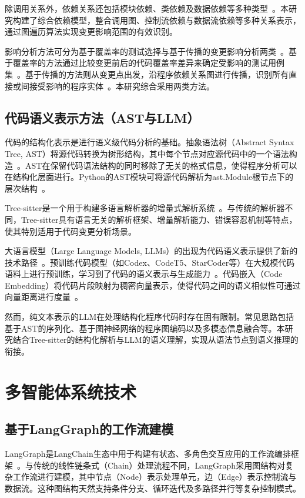 除调用关系外，依赖关系还包括模块依赖、类依赖及数据依赖等多种类型~\cite{AnselmGoldberg2003}。本研究构建了综合依赖模型，整合调用图、控制流依赖与数据流依赖等多种关系表示，通过图遍历算法实现变更影响范围的有效识别。

影响分析方法可分为基于覆盖率的测试选择与基于传播的变更影响分析两类~\cite{BohnerArnold1996}。基于覆盖率的方法通过比较变更前后的代码覆盖率差异来确定受影响的测试用例集~\cite{Chilakapati1998}。基于传播的方法则从变更点出发，沿程序依赖关系图进行传播，识别所有直接或间接受影响的程序实体~\cite{Le2018ImpactPropagation}。本研究综合采用两类方法。

\subsection{代码语义表示方法（AST与LLM）}
代码的结构化表示是进行语义级代码分析的基础。抽象语法树（Abstract Syntax Tree, AST）将源代码转换为树形结构，其中每个节点对应源代码中的一个语法构造~\cite{Aho2006Compilers}。AST在保留代码语法结构的同时移除了无关的格式信息，使得程序分析可以在结构化层面进行。Python的AST模块可将源代码解析为\textsf{ast.Module}根节点下的层次结构~\cite{PythonAST}。

Tree-sitter是一个用于构建多语言解析器的增量式解析系统~\cite{Brunsfeld2018TreeSitter}。与传统的解析器不同，Tree-sitter具有语言无关的解析框架、增量解析能力、错误容忍机制等特点，使其特别适用于代码变更分析场景。

大语言模型（Large Language Models, LLMs）的出现为代码语义表示提供了新的技术路径~\cite{Fan2023LLMSurvey}。预训练代码模型（如Codex、CodeT5、StarCoder等）在大规模代码语料上进行预训练，学习到了代码的语义表示与生成能力~\cite{Chen2021Codex}。代码嵌入（Code Embedding）将代码片段映射为稠密向量表示，使得代码之间的语义相似性可通过向量距离进行度量~\cite{Hindle2012Naturalness}。

然而，纯文本表示的LLM在处理结构化程序代码时存在固有限制。常见思路包括基于AST的序列化、基于图神经网络的程序图编码以及多模态信息融合等。本研究结合Tree-sitter的结构化解析与LLM的语义理解，实现从语法节点到语义推理的衔接。

\section{多智能体系统技术}
\subsection{基于LangGraph的工作流建模}
LangGraph是LangChain生态中用于构建有状态、多角色交互应用的工作流编排框架~\cite{LangGraphOfficial}。与传统的线性链条式（Chain）处理流程不同，LangGraph采用图结构对复杂工作流进行建模，其中节点（Node）表示处理单元，边（Edge）表示控制流与数据流。这种图结构天然支持条件分支、循环迭代及多路径并行等复杂控制模式。

